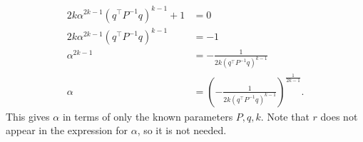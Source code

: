 \begin{homeworkProblem}
\begin{solution}
\begin{itemize}
                \begin{align*}
                    2 k \alpha^{2k - 1} (q^\top P^{-1} q)^{k-1} + 1 &= 0 \\
                    2 k \alpha^{2k - 1} (q^\top P^{-1} q)^{k-1} &= -1 \\
                    \alpha^{2k - 1} &= -\frac{1}{2 k (q^\top P^{-1} q)^{k-1}} \\
                    \alpha &= \left( -\frac{1}{2 k (q^\top P^{-1} q)^{k-1}} 
                    \right)^{\frac{1}{2k - 1}}.
                \end{align*}
                This gives $\alpha$ in terms of only the known parameters $P, q, k$. 
                Note that $r$ does not appear in the expression for $\alpha$, so it is 
                not needed.
        \end{itemize}

    \end{solution}

\end{homeworkProblem}